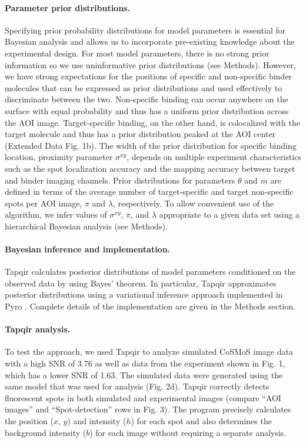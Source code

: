 \paragraph{Parameter prior distributions.}
Specifying prior probability distributions for model parameters is essential for Bayesian analysis and allows us to incorporate pre-existing knowledge about the experimental design. For most model parameters, there is no strong prior information so we use uninformative prior distributions (see Methods). However, we have strong expectations for the positions of specific and non-specific binder molecules that can be expressed as prior distributions and used effectively to discriminate between the two. Non-specific binding can occur anywhere on the surface with equal probability and thus has a uniform prior distribution across the AOI image. Target-specific binding, on the other hand, is colocalized with the target molecule and thus has a prior distribution peaked at the AOI center (Extended Data Fig. 1b). The width of the prior distribution for specific binding location, proximity parameter $\sigma^{xy}$, depends on multiple experiment characteristics such as the spot localization accuracy and the mapping accuracy between target and binder imaging channels. Prior distributions for parameters $\theta$ and $m$ are defined in terms of the average number of target-specific and target non-specific spots per AOI image, $\pi$ and $\lambda$, respectively. To allow convenient use of the algorithm, we infer values of $\sigma^{xy}$, $\pi$, and $\lambda$ appropriate to a given data set using a hierarchical Bayesian analysis (see Methods).

\paragraph{Bayesian inference and implementation.}
Tapqir calculates posterior distributions of model parameters conditioned on the observed data by using Bayes' theorem. In particular, Tapqir approximates posterior distributions using a variational inference approach implemented in Pyro \cite{Bingham2019-qy}.  Complete details of the implementation are given in the Methods section.

\paragraph{Tapqir analysis.} %
To test the approach, we used Tapqir to analyze simulated CoSMoS image data with a high SNR of 3.76 as well as data from the experiment shown in Fig. 1, which has a lower SNR of 1.63. The simulated data were generated using the same model that was used for analysis (Fig. 2d). Tapqir correctly detects fluorescent spots in both simulated and experimental images (compare ``AOI images'' and ``Spot-detection'' rows in Fig. 3). The program precisely calculates the position ($x$, $y$) and intensity ($h$) for each spot and also determines the background intensity ($b$) for each image without requiring a separate analysis. 

